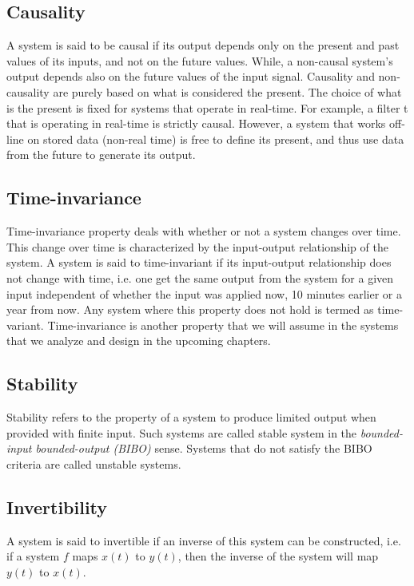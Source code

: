 \subsection{Causality}
A system is said to be causal if its output depends only on the present and past values of its inputs, and not on the future values. While, a non-causal system's output depends also on the future values of the input signal. Causality and non-causality are purely based on what is considered the present. The choice of what is the present is fixed for systems that operate in real-time. For example, a filter t that is operating in real-time is strictly causal. However, a system that works off-line on stored data (non-real time) is free to define its present, and thus use data from the future to generate its output.

\subsection{Time-invariance}
Time-invariance property deals with whether or not a system changes over time. This change over time is characterized by the input-output relationship of the system. A system is said to time-invariant if its input-output relationship does not change with time, i.e. one get the same output from the system for a given input independent of whether the input was applied now, 10 minutes earlier or a year from now. Any system where this property does not hold is termed as time-variant. Time-invariance is another property that we will assume in the systems that we analyze and design in the upcoming chapters.

\subsection{Stability}
Stability refers to the property of a system to produce limited output when provided with finite input. Such systems are called stable system in the \textit{bounded-input bounded-output (BIBO)} sense. Systems that do not satisfy the BIBO criteria are called unstable systems.

\subsection{Invertibility}
A system is said to invertible if an inverse of this system can be constructed, i.e. if a system $f$ maps $x\left(t\right)$ to $y\left(t\right)$, then the inverse of the system will map $y\left(t\right)$ to $x\left(t\right)$.
